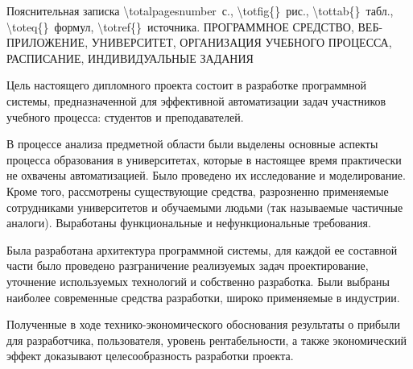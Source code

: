\thispagestyle{empty}

\newcommand{\totalpages}{\num{\totalpagesnumber}} 

\begin{center}
	Пояснительная записка \totalpages~с., \num{\totfig{}}~рис., \num{\tottab{}}~табл., \num{\toteq{}}~формул, \num{\totref{}}~источника.
	\MakeUppercase{Программное средство, веб-приложение, университет, организация учебного процесса, расписание, индивидуальные задания}
\end{center}

Цель настоящего дипломного проекта состоит в разработке программной системы, предназначенной для эффективной автоматизации задач участников учебного процесса: студентов и преподавателей. 

В процессе анализа предметной области были выделены основные аспекты процесса образования в университетах, которые в настоящее время практически не охвачены автоматизацией. Было проведено их исследование и моделирование. Кроме того, рассмотрены существующие средства, разрозненно применяемые сотрудниками университетов и обучаемыми людьми (так называемые частичные аналоги). Выработаны функциональные и нефункциональные требования.

Была разработана архитектура программной системы, для каждой ее составной части было проведено разграничение реализуемых задач проектирование, уточнение используемых технологий и собственно разработка. Были выбраны наиболее современные средства разработки, широко применяемые в индустрии. 

Полученные в ходе технико-экономического обоснования результаты о прибыли для разработчика, пользователя, уровень рентабельности, а также экономический эффект доказывают целесообразность разработки проекта.
